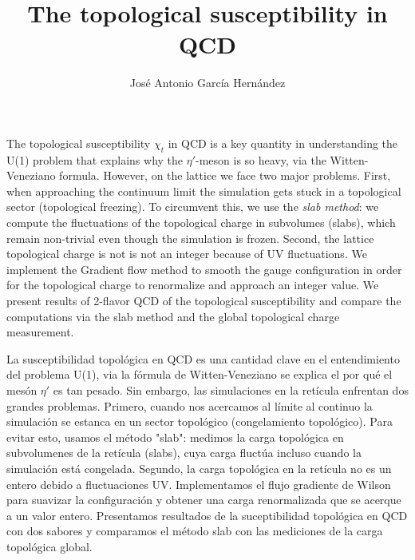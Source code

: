 \documentclass[12pt,a4paper]{article}
\author{José Antonio García Hernández}
\title{The topological susceptibility in QCD}
\begin{document}
\maketitle

The topological susceptibility $\chi_t$ in QCD is a key quantity in understanding the U(1) problem that explains why the $\eta'$-meson is so heavy, via the Witten-Veneziano formula.
However, on the lattice we face two major problems. First, when approaching the continuum limit the simulation gets stuck in a topological sector (topological freezing). To circumvent this, we use the \textit{slab method}: we compute the fluctuations of the topological charge in subvolumes (slabs), which remain non-trivial even though the simulation is frozen. Second, the lattice topological charge is not is not an integer because of UV fluctuations. We implement the Gradient flow method to smooth the gauge configuration in order for the topological charge to renormalize and approach an integer value. We present results of 2-flavor QCD of the topological susceptibility and compare the computations via the slab method and the global topological charge measurement.


La susceptibilidad topológica en QCD es una cantidad clave en el entendimiento del problema U(1), via la fórmula de Witten-Veneziano se explica el por qué el mesón $\eta'$ es tan pesado. Sin embargo, las simulaciones en la retícula enfrentan dos grandes problemas. Primero, cuando nos acercamos al límite al continuo la simulación se estanca en un sector topológico (congelamiento topológico). Para evitar esto, usamos el método "slab": medimos la carga topológica en subvolumenes de la retícula (slabs), cuya carga fluctúa incluso cuando la simulación está congelada. Segundo, la carga topológica en la retícula no es un entero debido a fluctuaciones UV. Implementamos el flujo gradiente de Wilson para suavizar la configuración y obtener una carga renormalizada que se acerque a un valor entero. Presentamos resultados de la suceptibilidad topológica en QCD con dos sabores y comparamos el método slab con las mediciones de la carga topológica global.
\end{document}
